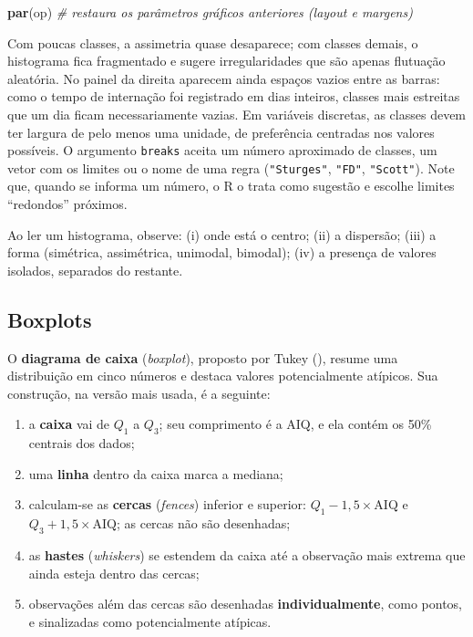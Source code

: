 \documentclass[
]{book}
\newenvironment{Shaded}{\begin{snugshade}}{\end{snugshade}}
\newcommand{\CommentTok}[1]{\textcolor[rgb]{0.56,0.35,0.01}{\textit{#1}}}
\newcommand{\FunctionTok}[1]{\textcolor[rgb]{0.13,0.29,0.53}{\textbf{#1}}}
\newcommand{\NormalTok}[1]{#1}
\providecommand{\tightlist}{%
  \setlength{\itemsep}{0pt}\setlength{\parskip}{0pt}}
\begin{document}
\begin{Shaded}
\begin{Highlighting}[]
\FunctionTok{par}\NormalTok{(op) }\CommentTok{\# restaura os parâmetros gráficos anteriores (layout e margens)}
\end{Highlighting}
\end{Shaded}

Com poucas classes, a assimetria quase desaparece; com classes demais, o histograma fica fragmentado e sugere irregularidades que são apenas flutuação aleatória. No painel da direita aparecem ainda espaços vazios entre as barras: como o tempo de internação foi registrado em dias inteiros, classes mais estreitas que um dia ficam necessariamente vazias. Em variáveis discretas, as classes devem ter largura de pelo menos uma unidade, de preferência centradas nos valores possíveis. O argumento \texttt{breaks} aceita um número aproximado de classes, um vetor com os limites ou o nome de uma regra (\texttt{"Sturges"}, \texttt{"FD"}, \texttt{"Scott"}). Note que, quando se informa um número, o R o trata como sugestão e escolhe limites ``redondos'' próximos.

Ao ler um histograma, observe: (i) onde está o centro; (ii) a dispersão; (iii) a forma (simétrica, assimétrica, unimodal, bimodal); (iv) a presença de valores isolados, separados do restante.

\subsection{Boxplots}\label{boxplots}

O \textbf{diagrama de caixa} (\emph{boxplot}), proposto por Tukey (), resume uma distribuição em cinco números e destaca valores potencialmente atípicos. Sua construção, na versão mais usada, é a seguinte:

\begin{enumerate}
\def\labelenumi{\arabic{enumi}.}
\tightlist
\item
  a \textbf{caixa} vai de \(Q_1\) a \(Q_3\); seu comprimento é a AIQ, e ela contém os 50\% centrais dos dados;
\item
  uma \textbf{linha} dentro da caixa marca a mediana;
\item
  calculam-se as \textbf{cercas} (\emph{fences}) inferior e superior: \(Q_1 - 1{,}5 \times \text{AIQ}\) e \(Q_3 + 1{,}5 \times \text{AIQ}\); as cercas não são desenhadas;
\item
  as \textbf{hastes} (\emph{whiskers}) se estendem da caixa até a observação mais extrema que ainda esteja dentro das cercas;
\item
  observações além das cercas são desenhadas \textbf{individualmente}, como pontos, e sinalizadas como potencialmente atípicas.
\end{enumerate}
\end{document}
